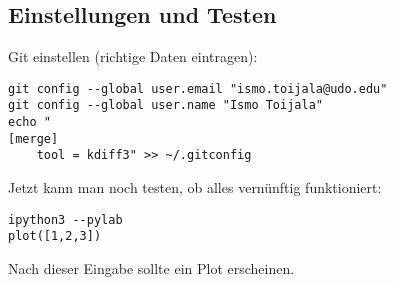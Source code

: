 \subsection{Einstellungen und Testen}
Git einstellen (richtige Daten eintragen):
\begin{verbatim}
git config --global user.email "ismo.toijala@udo.edu"
git config --global user.name "Ismo Toijala"
echo "
[merge]
    tool = kdiff3" >> ~/.gitconfig
\end{verbatim}
Jetzt kann man noch testen, ob alles vernünftig funktioniert:
\begin{verbatim}
ipython3 --pylab
plot([1,2,3])
\end{verbatim}
Nach dieser Eingabe sollte ein Plot erscheinen.
